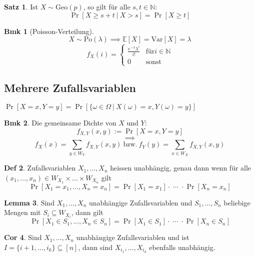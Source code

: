 \documentclass[a4paper, 10pt]{article}
\theoremstyle{definition}
\newtheorem{definition}{Def}[section]
\newtheorem{theorem}[definition]{Satz}
\newtheorem{nlemma}[definition]{Lemma}
\newtheorem{ncorollary}[definition]{Cor}
\newtheorem*{note}{Bmk}
\theoremstyle{named}
\newcommand{\N}{\mathbb{N}}
\newcommand{\E}{\mathbb{E}}
\newcommand{\Var}{\text{Var}}
\begin{document}
\setcounter{definition}{44}
\begin{theorem}
    Ist $X \sim \text{Geo}(p)$, so gilt für alle $s, t \in \N$:
    $$\Pr[X \geq s + t \ | \ X > s] = \Pr[X \geq t]$$
\end{theorem}

\begin{note}[Poisson-Verteilung]
    $$X \sim \text{Po}(\lambda) \implies \E[X] = \Var[X] = \lambda$$
    $$f_X(i) = \begin{cases}
        \frac{e^{-\lambda} \lambda^i}{i!} & \text{für} i \in \N \\
        0 & \text{sonst}
    \end{cases}$$
\end{note}

\subsection{Mehrere Zufallsvariablen}
$\Pr[X = x, Y = y] = \Pr[\{\omega \in \Omega \ | \ X(\omega) = x, Y(\omega) = y\}]$

\begin{note}
    Die gemeinsame Dichte von $X$ und $Y$:
    $$f_{X, Y}(x, y) := \Pr[X = x, Y = y]$$
    $$\implies$$
    $$f_X(x) = \sum_{y \in W_Y} f_{X, Y}(x, y) \ \text{bzw.} \ f_Y(y) = \sum_{x \in W_X} f_{X, Y}(x, y)$$
\end{note}

\setcounter{definition}{51}
\begin{definition}
    Zufallsvariablen $X_1, \ldots, X_n$ heissen unabhängig, genau dann wenn für alle $(x_1, \ldots, x_n) \in W_{X_1} \times \ldots \times W_{X_n}$ gilt
    $$\Pr[X_1 = x_1, \ldots , X_n = x_n] = \Pr[X_1 = x_1] \cdot \; \cdots \; \cdot \Pr[X_n = x_n]$$
\end{definition}

\begin{nlemma}
    Sind $X_1, \ldots, X_n$ unabhängige Zufallsvariablen und $S_1, \ldots, S_n$ beliebige Mengen mit $S_i \subseteq W_{X_i}$, dann gilt
    $$\Pr[X_1 \in S_1, \ldots, X_n \in S_n] = \Pr[X_1 \in S_1] \cdot \; \cdots \; \cdot \Pr[X_n \in S_n]$$
\end{nlemma}

\begin{ncorollary}
    Sind $X_1, \ldots, X_n$ unabhängige Zufallsvariablen und ist $I = \{i+1, \ldots, i_k\} \subseteq [n]$, dann sind $X_{i_1}, \ldots, X_{i_k}$ ebenfalls unabhängig.
\end{ncorollary}
\end{document}
